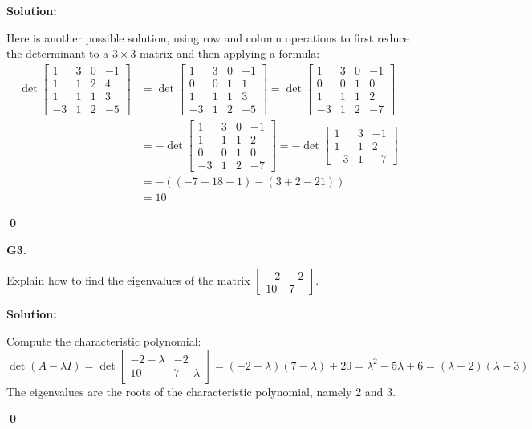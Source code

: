 \documentclass{article}
\newenvironment{problem}[1]
{
  \begin{flushleft}
  \textbf{#1}.
  \ignorespaces
}
{
  \end{flushleft}
}
\newenvironment{solution}
{
  \ignorespaces
  \textbf{Solution:}
}
{
  \ignorespacesafterend
  \begin{flushright}
  {\bfseries \qed}
  \end{flushright}
}
\begin{document}
\begin{solution}
Here is another possible solution, using row and column operations to first reduce
the determinant to a \(3\times 3\) matrix and then applying a formula:
\begin{align*}
\det
  \begin{bmatrix}
    1 & 3 & 0 & -1 \\
    1 & 1 & 2 & 4 \\
    1 & 1 & 1 & 3 \\
    -3 & 1 & 2 & -5
  \end{bmatrix}
&=
\det \begin{bmatrix} 1 & 3 & 0 & -1 \\ 0 & 0 & 1 & 1 \\ 1 & 1 & 1 & 3 \\ -3 & 1 & 2 & -5 \end{bmatrix} =
\det \begin{bmatrix} 1 & 3 & 0 & -1 \\ 0 & 0 & 1 & 0 \\ 1 & 1 & 1 & 2 \\ -3 & 1 & 2 & -7 \end{bmatrix} \\ &=
-\det \begin{bmatrix} 1 & 3 & 0 & -1 \\ 1 & 1 & 1 & 2 \\ 0 & 0 & 1 & 0 \\ -3 & 1 & 2 & -7 \end{bmatrix} =
-\det \begin{bmatrix} 1 & 3 & -1 \\ 1 & 1 & 2 \\ -3 & 1  & -7 \end{bmatrix} \\  &=
-((-7-18-1)-(3+2-21)) \\
 &=10
 \end{align*}



\end{solution}

\begin{problem}{G3}
Explain how to find the eigenvalues of the matrix \(\begin{bmatrix} -2 & -2 \\ 10 & 7 \end{bmatrix} \).
\end{problem}
\begin{solution}
Compute the characteristic polynomial: 
\[\det(A-\lambda I) = \det \begin{bmatrix} -2 - \lambda & -2 \\ 10 & 7-\lambda \end{bmatrix} = (-2-\lambda)(7-\lambda)+20 = \lambda ^2 -5\lambda +6 = (\lambda -2)(\lambda -3)\]
The eigenvalues are the roots of the characteristic polynomial, namely \(2\) and \(3\).
\end{solution}
\end{document}
